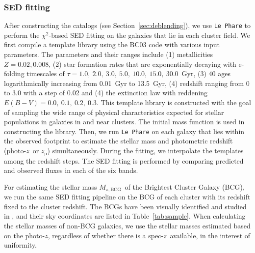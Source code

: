 \documentclass[useAMS,usenatbib,iop,numberedappendix]{mn2e}
\newcommand{\redshift}{\ensuremath{z}}
\newcommand{\zp}{\ensuremath{z_{\mathrm{p}}}}
\newcommand{\MBCG}{\ensuremath{M_{\star,\mathrm{BCG}}}}
\begin{document}
\subsubsection{SED fitting}
\label{sec:sedfitting}

After constructing the catalogs (see Section~\ref{sec:deblending}), we use \texttt{Le~Phare} \citep{arnouts99, ilbert06} to perform the $\chi^2$-based SED fitting on the galaxies that lie in each cluster field.
We first compile a template library using the BC03 code with various input parameters. 
The parameters and their ranges include (1) metallicities $Z = 0.02, 0.008$, (2) star formation rates that are exponentially decaying with e-folding timescales of $\tau = 1.0,~2.0,~3.0,~5.0,~10.0,~15.0,~30.0$~Gyr, (3) 40 ages logarithmically increasing from 0.01~Gyr to 13.5~Gyr, (4) redshift ranging from 0 to 3.0 with a step of 0.02 and (4) the \citet{calzetti00} extinction law with reddening $E\left(B-V\right) = 0.0,~0.1,~0.2,~0.3$.
This template library is constructed with the goal of sampling the wide range of physical characteristics expected for stellar populations in galaxies in and near clusters.
The \citet{chabrier03} initial mass function is used in constructing the library.  Then, we run \texttt{Le Phare} on each galaxy that lies within the observed footprint to estimate the stellar mass and photometric redshift (photo-\redshift\ or \zp) simultaneously.  During the fitting, we interpolate the templates among the redshift steps.
The SED fitting is performed by comparing predicted and observed fluxes in each of the six bands.

For estimating the stellar mass \MBCG\ of the Brightest Cluster Galaxy (BCG), we run the same SED fitting pipeline on the BCG of each cluster with its redshift fixed to the cluster redshift.  The BCGs have been visually identified and studied in \cite{mcdonald15}, and their sky coordinates are listed in Table~\ref{tab:sample}.  When calculating the stellar masses of non-BCG galaxies, we use the stellar masses estimated based on the photo-\redshift, regardless of whether there is a spec-\redshift\ available, in the interest of uniformity.
\end{document}
